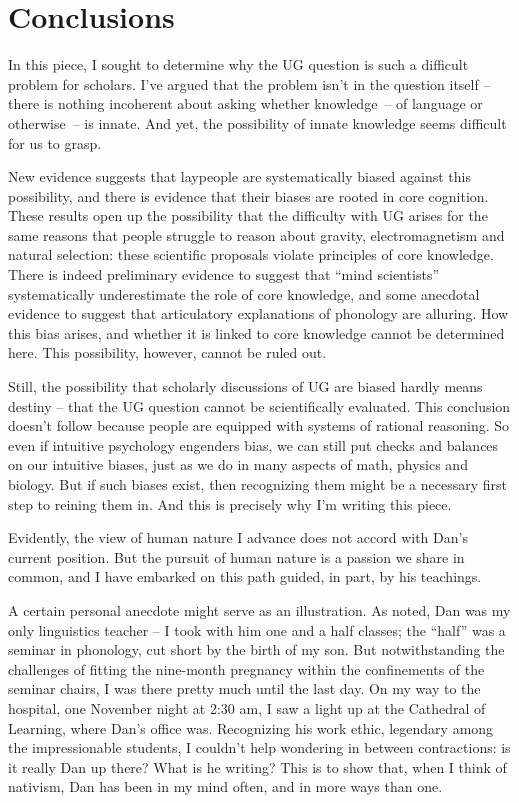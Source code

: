\documentclass[output=paper,colorlinks,citecolor=brown
]{langscibook}
\begin{document}
\section{Conclusions}
In this piece, I sought to determine why the UG question is such a difficult problem for scholars. I’ve argued that the problem isn’t in the question itself -- there is nothing incoherent about asking whether knowledge~-- of language or otherwise~-- is innate. And yet, the possibility of innate knowledge seems difficult for us to grasp. 

New evidence suggests that laypeople are systematically biased against this possibility, and there is evidence that their biases are rooted in core cognition. These results open up the possibility that the difficulty with UG arises for the same reasons that people struggle to reason about gravity, electromagnetism and natural selection: these scientific proposals violate principles of core knowledge. There is indeed preliminary evidence to suggest that ``mind scientists'' systematically underestimate the role of core knowledge, and some anecdotal evidence to suggest that articulatory explanations of phonology are alluring. How this bias arises, and whether it is linked to core knowledge cannot be determined here. This possibility, however, cannot be ruled out.

Still, the possibility that scholarly discussions of UG are biased hardly means destiny -- that the UG question cannot be scientifically evaluated. This conclusion doesn’t follow because people are equipped with systems of rational reasoning. So even if intuitive psychology engenders bias, we can still put checks and balances on our intuitive biases, just as we do in many aspects of math, physics and biology. But if such biases exist, then recognizing them might be a necessary first step to reining them in. And this is precisely why I’m writing this piece.

Evidently, the view of human nature I advance does not accord with Dan’s current position. But the pursuit of human nature is a passion we share in common, and I have embarked on this path guided, in part, by his teachings. 

A certain personal anecdote might serve as an illustration. As noted, Dan was my only linguistics teacher -- I took with him one and a half classes; the ``half'' was a seminar in phonology, cut short by the birth of my son. But notwithstanding the challenges of fitting the nine-month pregnancy within the confinements of the seminar chairs, I was there pretty much until the last day. On my way to the hospital, one November night at 2:30 am, I saw a light up at the Cathedral of Learning, where Dan’s office was. Recognizing his work ethic, legendary among the impressionable students, I couldn’t help wondering in between contractions: is it really Dan up there? What is he writing? This is to show that, when I think of nativism, Dan has been in my mind often, and in more ways than one. 

\printbibliography[heading=subbibliography,notkeyword=this]

\sloppy
\end{document}
